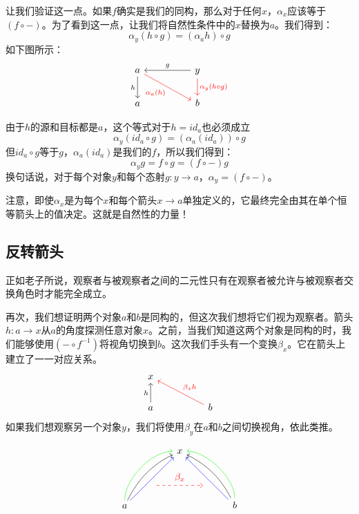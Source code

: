 \documentclass[DaoFP]{subfiles}
\begin{document}
让我们验证这一点。如果$f$确实是我们的同构，那么对于任何$x$，$\alpha_x$应该等于$(f \circ -)$。为了看到这一点，让我们将自然性条件中的$x$替换为$a$。我们得到：
\[\alpha_y(h \circ g) = (\alpha_a h) \circ g \]
如下图所示：
\[
 \begin{tikzcd}
 a
 \arrow[d, "h"']
 \arrow[rrd,  red, "\alpha_a (h)"']
 && y
 \arrow[ll, "g"']
 \arrow[d, red, "\alpha_y (h \circ g)"]
   \\
 a
  && b
 \end{tikzcd}
\]


由于$h$的源和目标都是$a$，这个等式对于$h = id_a$也必须成立
\[\alpha_y (id_a \circ g) = (\alpha_a (id_a)) \circ g \]
但$id_a \circ g$等于$g$，$\alpha_a(id_a)$是我们的$f$，所以我们得到：
\[\alpha_y g = f \circ g = (f \circ -) g\]
换句话说，对于每个对象$y$和每个态射$g \colon y \to a$，$\alpha_y = (f \circ -)$。

注意，即使$\alpha_x$是为每个$x$和每个箭头$x \to a$单独定义的，它最终完全由其在单个恒等箭头上的值决定。这就是自然性的力量！
\subsection{反转箭头}
正如老子所说，观察者与被观察者之间的二元性只有在观察者被允许与被观察者交换角色时才能完全成立。

再次，我们想证明两个对象$a$和$b$是同构的，但这次我们想将它们视为观察者。箭头$h \colon a \to x$从$a$的角度探测任意对象$x$。之前，当我们知道这两个对象是同构的时，我们能够使用$(- \circ f^{-1})$将视角切换到$b$。这次我们手头有一个变换$\beta_x$。它在箭头上建立了一一对应关系。
\[
 \begin{tikzcd}
 x
 \\
 a
\arrow[u, "h"]
 && b
  \arrow[llu, red, "\beta_x h"']
  \end{tikzcd}
\]
如果我们想观察另一个对象$y$，我们将使用$\beta_y$在$a$和$b$之间切换视角，依此类推。

\[
 \begin{tikzcd}
 \node(x) at (0, 2) {x};
 \node(a) at (-2, 0) {a};
 \node(b) at (2, 0) {b};
 \node(c1) at (-1, 1.5) {};
 \node(c2) at (-1.5, 1) {};
 \node(c3) at (-1, 2) {};
 \node(c4) at (-2, 1) {};
 \node(d1) at (1, 1.5) {};
 \node(d2) at (1.5, 1) {};
 \node(d3) at (1, 2) {};
 \node(d4) at (2, 1) {};
\node (aa) at (-1, 0.75) {};
 \node (bb) at (1, 0.75) {};
 \draw[<-] (x) .. controls (c1)  and (c2) .. (a); %
 \draw[<-, green] (x) .. controls (c3)  and (c4) .. (a); %
 \draw[<-, blue] (x) -- (a); 
  \draw[<-] (x) .. controls (d1)  and (d2) .. (b); %
 \draw[<-, green] (x) .. controls (d3)  and (d4) .. (b); %
 \draw[<-, blue] (x) -- (b); 
 \draw[->, red, dashed] (aa) -- node[above]{\beta_x} (bb);
 \end{tikzcd}
\]
\end{document}
